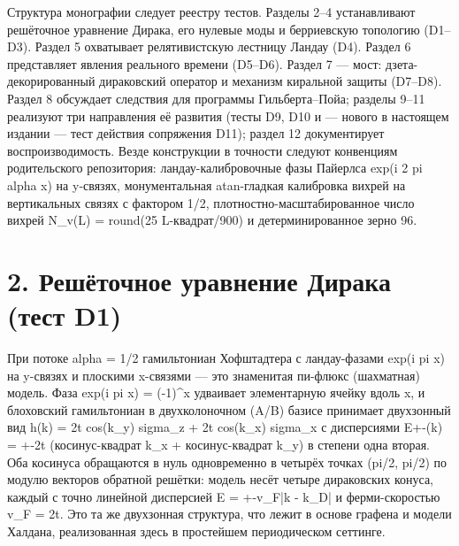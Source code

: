 \documentclass[11pt,a4paper]{article}
\begin{document}
Структура монографии следует реестру тестов. Разделы 2--4 устанавливают решёточное уравнение Дирака, его нулевые моды и берриевскую топологию (D1--D3). Раздел 5 охватывает релятивистскую лестницу Ландау (D4). Раздел 6 представляет явления реального времени (D5--D6). Раздел 7 --- мост: дзета-декорированный дираковский оператор и механизм киральной защиты (D7--D8). Раздел 8 обсуждает следствия для программы Гильберта--Пойа; разделы 9--11 реализуют три направления её развития (тесты D9, D10 и --- нового в настоящем издании --- тест действия сопряжения D11); раздел 12 документирует воспроизводимость. Везде конструкции в точности следуют конвенциям родительского репозитория: ландау-калибровочные фазы Пайерлса exp(i 2 pi alpha x) на y-связях, монументальная atan-гладкая калибровка вихрей на вертикальных связях с фактором 1/2, плотностно-масштабированное число вихрей N\_\allowbreak{}v(L) = round(25 L-квадрат/900) и детерминированное зерно 96.

\section{2. Решёточное уравнение Дирака (тест D1)}
При потоке alpha = 1/2 гамильтониан Хофштадтера с ландау-фазами exp(i pi x) на y-связях и плоскими x-связями --- это знаменитая пи-флюкс (шахматная) модель. Фаза exp(i pi x) = (-1)\^{}x удваивает элементарную ячейку вдоль x, и блоховский гамильтониан в двухколоночном (A/B) базисе принимает двухзонный вид h(k) = 2t cos(k\_\allowbreak{}y) sigma\_\allowbreak{}z + 2t cos(k\_\allowbreak{}x) sigma\_\allowbreak{}x с дисперсиями E+-(k) = +-2t (косинус-квадрат k\_\allowbreak{}x + косинус-квадрат k\_\allowbreak{}y) в степени одна вторая. Оба косинуса обращаются в нуль одновременно в четырёх точках (pi/2, pi/2) по модулю векторов обратной решётки: модель несёт четыре дираковских конуса, каждый с точно линейной дисперсией E = +-v\_\allowbreak{}F|k - k\_\allowbreak{}D| и ферми-скоростью v\_\allowbreak{}F = 2t. Это та же двухзонная структура, что лежит в основе графена и модели Халдана, реализованная здесь в простейшем периодическом сеттинге.
\end{document}

